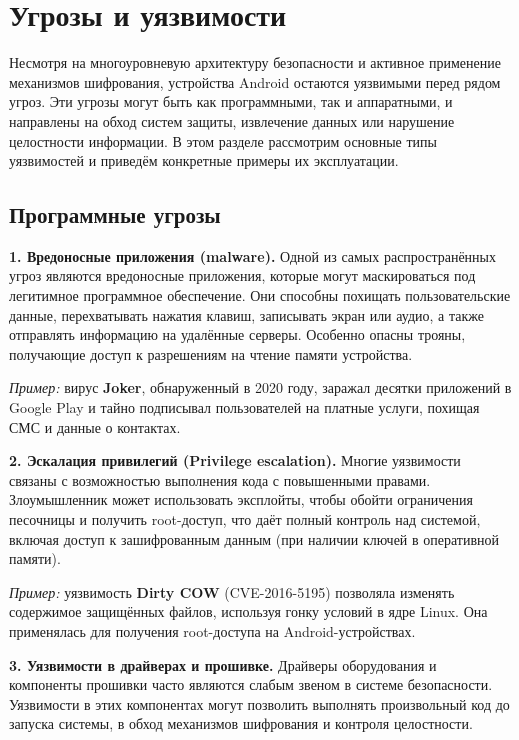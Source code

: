 \section{Угрозы и уязвимости}

Несмотря на многоуровневую архитектуру безопасности и активное применение
механизмов шифрования, устройства Android остаются уязвимыми перед рядом угроз.
Эти угрозы могут быть как программными, так и аппаратными, и направлены на
обход систем защиты, извлечение данных или нарушение целостности информации. В
этом разделе рассмотрим основные типы уязвимостей и приведём конкретные примеры
их эксплуатации.

\subsection{Программные угрозы}

\textbf{1. Вредоносные приложения (malware).}
Одной из самых распространённых угроз являются вредоносные приложения, которые
могут маскироваться под легитимное программное обеспечение. Они способны
похищать пользовательские данные, перехватывать нажатия клавиш, записывать
экран или аудио, а также отправлять информацию на удалённые серверы. Особенно
опасны трояны, получающие доступ к разрешениям на чтение памяти устройства.

\textit{Пример:} вирус \textbf{Joker}, обнаруженный в 2020 году, заражал
десятки приложений в Google Play и тайно подписывал пользователей на платные
услуги, похищая СМС и данные о контактах.

\textbf{2. Эскалация привилегий (Privilege escalation).}
Многие уязвимости связаны с возможностью выполнения кода с повышенными правами.
Злоумышленник может использовать эксплойты, чтобы обойти ограничения песочницы
и получить root-доступ, что даёт полный контроль над системой, включая доступ к
зашифрованным данным (при наличии ключей в оперативной памяти).

\textit{Пример:} уязвимость \textbf{Dirty COW} (CVE-2016-5195) позволяла
изменять содержимое защищённых файлов, используя гонку условий в ядре Linux.
Она применялась для получения root-доступа на Android-устройствах.

\textbf{3. Уязвимости в драйверах и прошивке.}
Драйверы оборудования и компоненты прошивки часто являются слабым звеном в
системе безопасности. Уязвимости в этих компонентах могут позволить выполнять
произвольный код до запуска системы, в обход механизмов шифрования и контроля
целостности.

